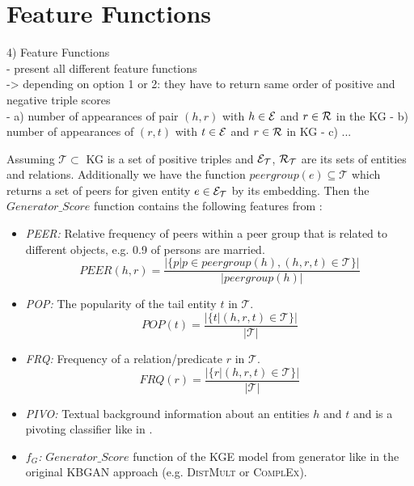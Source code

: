 \section{Feature Functions} 
\label{sec:feature_functions}


4) Feature Functions\\

- present all different feature functions\\
-> depending on option 1 or 2: they have to return same order of positive and negative triple scores\\
- a)  number of appearances of pair $(h,r)$ with $h \in \mathcal{E}$ and $r \in \mathcal{R}$ in the KG
- b) number of appearances of $(r,t)$ with $t \in \mathcal{E}$ and $r \in \mathcal{R}$ in KG
- c) ...



Assuming $\mathcal{T} \subset $ \ac{KG} is a set of positive triples and $\mathcal{E}_{\mathcal{T}}$, $\mathcal{R}_{\mathcal{T}}$ are its sets of entities and relations.
Additionally we have the function $peergroup(e) \subseteq \mathcal{T}$ which returns a set of peers for given entity $e \in \mathcal{E}_{\mathcal{T}}$ by its embedding. 
Then the $Generator\_Score$ function contains the following features from \cite{arnaout2020enriching}:
\begin{itemize}
    \item 
    \emph{\ac{PEER}:} 
    Relative frequency of peers within a peer group that is related to different objects, e.g. 0.9 of persons are married. 
    \begin{equation}
        PEER(h,r) = \frac{|\{p | p \in peergroup(h), (h, r, t) \in \mathcal{T}\}|}{|peergroup(h)|}
    \end{equation}

    \item
    \emph{\ac{POP}:} 
    The popularity of the tail entity $t$ in $\mathcal{T}$. 
    \begin{equation}
        POP(t) = \frac{|\{t | (h, r , t) \in \mathcal{T}\}|}{|\mathcal{T}|}
    \end{equation}

    \item 
    \emph{\ac{FRQ}:} 
    Frequency of a relation/predicate $r$ in $\mathcal{T}$. 
    \begin{equation}
        FRQ(r) = \frac{|\{r | (h, r, t) \in \mathcal{T}\}|}{|\mathcal{T}|}
    \end{equation}
    
    \item 
    \emph{\ac{PIVO}:} 
    Textual background information about an entities $h$ and $t$ and is a pivoting classifier like in \cite{arnaout2020enriching}.
    
    \item 
    \emph{$f_G$:} 
    $Generator\_Score$ function of the \ac{KGE} model from generator like in the original \ac{KBGAN} approach (e.g. \textsc{DistMult}  or \textsc{ComplEx}).
    
\end{itemize}